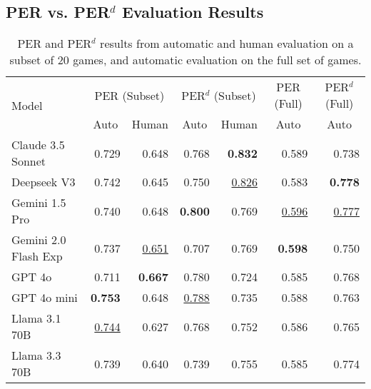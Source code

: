 \subsection{PER vs. PER$^d$ Evaluation Results}
\begin{table*}[!ht]
\centering
\begin{tabular}{lrrrrrr}
\toprule
\multirow{2}{*}{Model} & \multicolumn{2}{c}{PER (Subset)} & \multicolumn{2}{c}{PER$^d$ (Subset)} & \multicolumn{1}{c}{PER (Full)} & \multicolumn{1}{c}{PER$^d$ (Full)}\\ 
& \multicolumn{1}{c}{Auto} & \multicolumn{1}{c}{Human} & \multicolumn{1}{c}{Auto} & \multicolumn{1}{c}{Human} & \multicolumn{1}{c}{Auto} & \multicolumn{1}{c}{Auto}\\
\midrule
Claude 3.5 Sonnet & 0.729 & 0.648 & 0.768 & \textbf{0.832} & 0.589 & 0.738 \\
Deepseek V3 & 0.742 & 0.645 & 0.750 & \underline{0.826} & 0.583 & \textbf{0.778}\\
Gemini 1.5 Pro & 0.740 & 0.648 & \textbf{0.800} & 0.769 & \underline{0.596} & \underline{0.777}\\
Gemini 2.0 Flash Exp & 0.737& \underline{0.651} & 0.707 & 0.769 &\textbf{0.598} & 0.750\\
GPT 4o & 0.711 & \textbf{0.667} & 0.780 & 0.724 & 0.585 & 0.768 \\
GPT 4o mini & \textbf{0.753}  & 0.648 & \underline{0.788} & 0.735 & 0.588 & 0.763\\
Llama 3.1 70B & \underline{0.744}  & 0.627 & 0.768 & 0.752 & 0.586 & 0.765\\
Llama 3.3 70B & 0.739 & 0.640 & 0.739 & 0.755 & 0.585 &0.774\\
\bottomrule
\end{tabular}
\caption{PER and PER$^d$ results from automatic and human evaluation on a subset of 20 games, and automatic evaluation on the full set of games.}
\label{tab:per_evaluation_results}
\end{table*}


